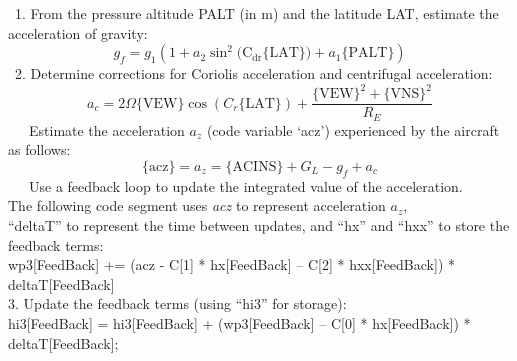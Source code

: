 \documentclass[
  english,
]{book}
\begin{document}
~1. From the pressure altitude PALT (in m) and the latitude LAT, estimate
the acceleration of gravity:\\
\begin{equation}
g_{f}=g_{1}\left(1+a_{2}\sin^{2}(\mathrm{C_{dr}\{LAT\})}+a_{1}\mathrm{\{PALT\}}\right)
\label{eq:gf}
\end{equation}
~2. Determine corrections for Coriolis acceleration
and centrifugal acceleration:\\
\begin{equation}
a_{c}=2\Omega\mathrm{\{VEW\}}\cos(C_{r}\mathrm{\{LAT\}})+\frac{\mathrm{\{VEW\}}^{2}+\mathrm{\{VNS\}}^{2}}{R_{E}}
\label{eq:ac}
\end{equation}
~~~Estimate the acceleration \(a_{z}\) (code variable `acz') experienced
by the aircraft as follows:\\
\begin{equation}
\mathrm{\{acz\}}=a_{z}=\mathrm{\{ACINS\}}+G_{L}-g_{f}+a_{c}
\label{eq:acz}
\end{equation}
~~~Use a feedback loop to update the integrated value of the acceleration.\\
\hspace*{0.333em}\hspace*{0.333em}\hspace*{0.333em}The following code segment uses \emph{acz} to represent acceleration \(a_{z}\),\\
\hspace*{0.333em}\hspace*{0.333em}\hspace*{0.333em}``deltaT'' to represent the time between updates, and ``hx'' and ``hxx''
to store the feedback terms:\\
\hspace*{0.333em}\hspace*{0.333em}\hspace*{0.333em}\hspace*{0.333em}\hspace*{0.333em}wp3{[}FeedBack{]} += (acz - C{[}1{]} * hx{[}FeedBack{]} -- C{[}2{]} * hxx{[}FeedBack{]}) * deltaT{[}FeedBack{]}\\
\hspace*{0.333em}3. Update the feedback terms (using ``hi3'' for storage):\\
\hspace*{0.333em}\hspace*{0.333em}\hspace*{0.333em}\hspace*{0.333em}\hspace*{0.333em}hi3{[}FeedBack{]} = hi3{[}FeedBack{]} + (wp3{[}FeedBack{]} -- C{[}0{]} * hx{[}FeedBack{]}) * deltaT{[}FeedBack{]};\\
\end{document}

